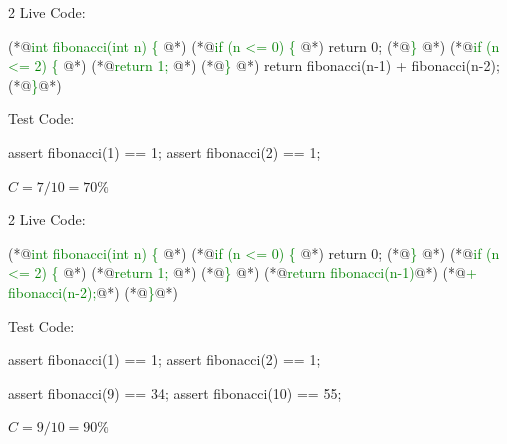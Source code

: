 \documentclass{article}
\begin{document}


\begin{multicols}{2}
Live Code:\par
{\small\begin{ffcode}
(*@\textcolor{green}{int fibonacci(int n) \{} @*)
  (*@\textcolor{green}{if (n <= 0) \{} @*)
    return 0;
  (*@\textcolor{green}{\}} @*)
  (*@\textcolor{green}{if (n <= 2) \{} @*)
    (*@\textcolor{green}{return 1;} @*)
  (*@\textcolor{green}{\}} @*)
  return fibonacci(n-1)
    + fibonacci(n-2);
(*@\textcolor{green}{\}}@*)
\end{ffcode}
}
\par\columnbreak\par
Test Code:\par
{\small\begin{ffcode}
assert fibonacci(1) == 1;
assert fibonacci(2) == 1;
\end{ffcode}
}
\( C = 7/10 = 70\% \)
\end{multicols}
\plush{}

\begin{multicols}{2}
Live Code:\par
{\small\begin{ffcode}
(*@\textcolor{green}{int fibonacci(int n) \{} @*)
  (*@\textcolor{green}{if (n <= 0) \{} @*)
    return 0;
  (*@\textcolor{green}{\}} @*)
  (*@\textcolor{green}{if (n <= 2) \{} @*)
    (*@\textcolor{green}{return 1;} @*)
  (*@\textcolor{green}{\}} @*)
  (*@\textcolor{green}{return fibonacci(n-1)}@*)
    (*@\textcolor{green}{+ fibonacci(n-2);}@*)
(*@\textcolor{green}{\}}@*)
\end{ffcode}
}
\par\columnbreak\par
Test Code:\par
{\small\begin{ffcode}
assert fibonacci(1) == 1;
assert fibonacci(2) == 1;

assert fibonacci(9) == 34;
assert fibonacci(10) == 55;
\end{ffcode}
}
\( C = 9/10 = 90\% \)
\end{multicols}
\plush{}


\end{document}
